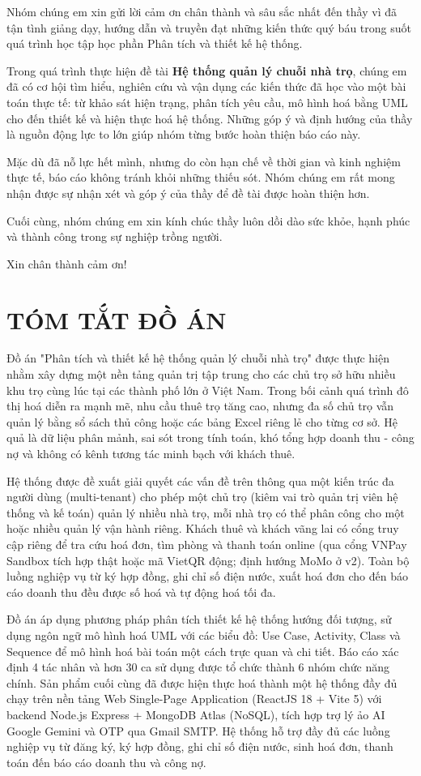 \documentclass[a4paper,oneside]{report}
\newcommand{\chuongkhongso}[1]{%
  \chapter*{#1}%
  \addcontentsline{toc}{chapter}{#1}}
\begin{document}
Nhóm chúng em xin gửi lời cảm ơn chân thành và sâu sắc nhất đến thầy vì
đã tận tình giảng dạy, hướng dẫn và truyền đạt những kiến thức quý báu
trong suốt quá trình học tập học phần Phân tích và thiết kế hệ thống.

Trong quá trình thực hiện đề tài \textbf{Hệ thống quản lý chuỗi nhà trọ}, chúng
em đã có cơ hội tìm hiểu, nghiên cứu và vận dụng các kiến thức đã học
vào một bài toán thực tế: từ khảo sát hiện trạng, phân tích yêu cầu, mô
hình hoá bằng UML cho đến thiết kế và hiện thực hoá hệ thống. Những góp
ý và định hướng của thầy là nguồn động lực to lớn giúp nhóm từng bước
hoàn thiện báo cáo này.

Mặc dù đã nỗ lực hết mình, nhưng do còn hạn chế về thời gian và kinh
nghiệm thực tế, báo cáo không tránh khỏi những thiếu sót. Nhóm chúng em
rất mong nhận được sự nhận xét và góp ý của thầy để đề tài được hoàn
thiện hơn.

Cuối cùng, nhóm chúng em xin kính chúc thầy luôn dồi dào sức khỏe, hạnh
phúc và thành công trong sự nghiệp trồng người.

Xin chân thành cảm ơn!

\chuongkhongso{TÓM TẮT ĐỒ ÁN}

Đồ án "Phân tích và thiết kế hệ thống quản lý chuỗi nhà trọ" được thực
hiện nhằm xây dựng một nền tảng quản trị tập trung cho các chủ trọ sở
hữu nhiều khu trọ cùng lúc tại các thành phố lớn ở Việt Nam. Trong bối
cảnh quá trình đô thị hoá diễn ra mạnh mẽ, nhu cầu thuê trọ tăng cao,
nhưng đa số chủ trọ vẫn quản lý bằng sổ sách thủ công hoặc các bảng
Excel riêng lẻ cho từng cơ sở. Hệ quả là dữ liệu phân mảnh, sai sót
trong tính toán, khó tổng hợp doanh thu - công nợ và không có kênh tương
tác minh bạch với khách thuê.

Hệ thống được đề xuất giải quyết các vấn đề trên thông qua một kiến trúc
đa người dùng (multi-tenant) cho phép một chủ trọ (kiêm vai trò quản trị
viên hệ thống và kế toán) quản lý nhiều nhà trọ, mỗi nhà trọ có thể phân
công cho một hoặc nhiều quản lý vận hành riêng. Khách thuê và khách vãng
lai có cổng truy cập riêng để tra cứu hoá đơn, tìm phòng và thanh toán
online (qua cổng VNPay Sandbox tích hợp thật hoặc mã VietQR động; định
hướng MoMo ở v2). Toàn bộ luồng nghiệp vụ từ ký hợp đồng, ghi chỉ số
điện nước, xuất hoá đơn cho đến báo cáo doanh thu đều được số hoá và tự
động hoá tối đa.

Đồ án áp dụng phương pháp phân tích thiết kế hệ thống hướng đối tượng,
sử dụng ngôn ngữ mô hình hoá UML với các biểu đồ: Use Case, Activity,
Class và Sequence để mô hình hoá bài toán một cách trực quan và chi
tiết. Báo cáo xác định 4 tác nhân và hơn 30 ca sử dụng được tổ chức
thành 6 nhóm chức năng chính. Sản phẩm cuối cùng đã được hiện thực hoá
thành một hệ thống đầy đủ chạy trên nền tảng Web Single-Page Application
(ReactJS 18 + Vite 5) với backend Node.js Express + MongoDB Atlas
(NoSQL), tích hợp trợ lý ảo AI Google Gemini và OTP qua Gmail SMTP. Hệ
thống hỗ trợ đầy đủ các luồng nghiệp vụ từ đăng ký, ký hợp đồng, ghi chỉ
số điện nước, sinh hoá đơn, thanh toán đến báo cáo doanh thu và công nợ.
\end{document}
